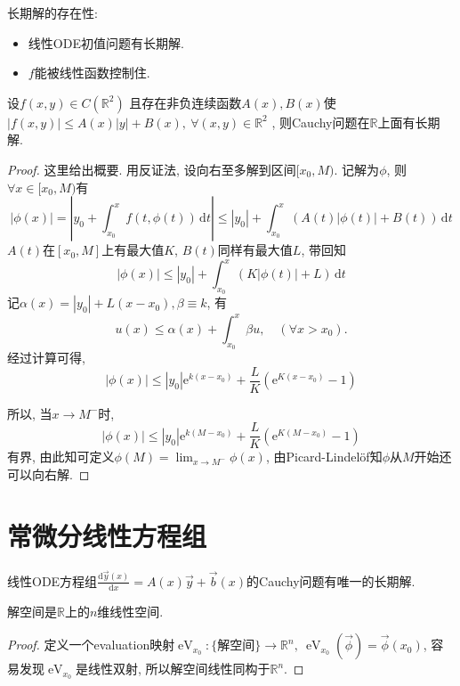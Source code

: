 长期解的存在性:
\begin{itemize}
  \item 线性ODE初值问题有长期解.
  \item $f$能被线性函数控制住.
\end{itemize}
\begin{theorem}
  设$f(x,y) \in C\left( \mathbb{R}^{2} \right)$ 且存在非负连续函数$A(x), B(x)$使 $|f(x,y)| \le A(x)|y| + B(x), \ \forall (x,y) \in \mathbb{R}^{2}$ , 则Cauchy问题在$\mathbb{R}$上面有长期解.
\end{theorem}
\begin{proof}
  这里给出概要. 用反证法, 设向右至多解到区间$[x_0,M)$. 记解为$\phi $, 则$\forall x \in [x_0,M)$有
  \begin{equation}
    |\phi (x)| = \left| y_0 + \int_{x_0}^{x} f(t,\phi (t)) \, \mathrm{d}t  \right| \le |y_0| + \int_{x_0}^{x} \left( A(t) |\phi (t)| + B(t) \right) \, \mathrm{d}t
  \end{equation}
  $A(t)$在$[x_0,M]$上有最大值$K$, $B(t)$同样有最大值$L$, 带回知
  \begin{equation}
    |\phi (x)| \le |y_0| + \int _{x_0}^{x} \left( K|\phi (t)| + L \right) \, \mathrm{d} t
  \end{equation}
  记$\alpha(x) = |y_0| + L(x-x_0), \beta \equiv k$, 有
  \begin{equation}
    u(x) \le \alpha(x) + \int _{x_0}^{x} \beta u ,\quad (\forall x>x_0).
  \end{equation}
  经过计算可得,
  \begin{equation}
    |\phi (x)| \le |y_0|\mathrm{e}^{k(x-x_0)} + \frac{L}{K} \left( \mathrm{e}^{K(x-x_0)} -1 \right)
  \end{equation}

  所以, 当$x \to M^{-}$时,
  \begin{equation}
    |\phi (x)| \le |y_0| \mathrm{e}^{k(M-x_0)} + \frac{L}{K} \left( \mathrm{e}^{K(M-x_0)} -1 \right)
  \end{equation}
  有界, 由此知可定义$\phi (M) = \lim _{x \to M^{-}} \phi (x)$, 由Picard-Lindel\"of知$\phi $从$M$开始还可以向右解.
\end{proof}

\section{常微分线性方程组}
线性ODE方程组$\frac{\mathrm{d} \vec{y}(x)}{\mathrm{d} x} = A(x) \vec{y} + \vec{b}(x)$的Cauchy问题有唯一的长期解.

\begin{theorem}
  解空间是$\mathbb{R}$上的$n$维线性空间.
\end{theorem}
\begin{proof}
  定义一个evaluation映射$\operatorname{eV}_{x_0}\colon \{ \text{解空间} \} \to \mathbb{R}^{n},\ \operatorname{eV}_{x_0}(\vec{\phi}) = \vec{\phi}(x_0)$, 容易发现$\operatorname{eV}_{x_0}$是线性双射, 所以解空间线性同构于$\mathbb{R}^{n}$.
\end{proof}

